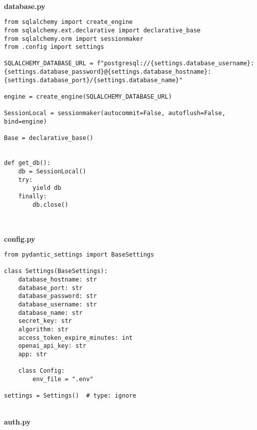 \
\\
\textbf{database.py}

\begin{Verbatim}[breaklines=true, breakanywhere=true]
from sqlalchemy import create_engine
from sqlalchemy.ext.declarative import declarative_base
from sqlalchemy.orm import sessionmaker
from .config import settings

SQLALCHEMY_DATABASE_URL = f"postgresql://{settings.database_username}:{settings.database_password}@{settings.database_hostname}:{settings.database_port}/{settings.database_name}"

engine = create_engine(SQLALCHEMY_DATABASE_URL)

SessionLocal = sessionmaker(autocommit=False, autoflush=False, bind=engine)

Base = declarative_base()


def get_db():
    db = SessionLocal()
    try:
        yield db
    finally:
        db.close()
  
\end{Verbatim}

\
\\
\textbf{config.py}

\begin{Verbatim}[breaklines=true, breakanywhere=true]
from pydantic_settings import BaseSettings

class Settings(BaseSettings):
    database_hostname: str
    database_port: str
    database_password: str
    database_username: str
    database_name: str
    secret_key: str
    algorithm: str
    access_token_expire_minutes: int
    openai_api_key: str
    app: str

    class Config:
        env_file = ".env"

settings = Settings()  # type: ignore
\end{Verbatim}

\
\\
\textbf{auth.py}

